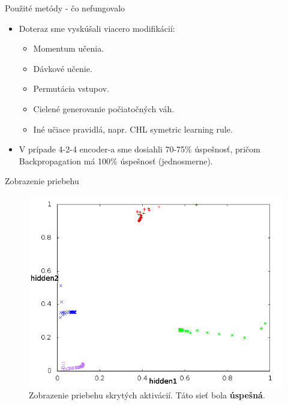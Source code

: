 \documentclass[xcolor=dvipsnames]{beamer}
\begin{document}
\begin{frame}{Použité metódy - čo nefungovalo}
  \begin{itemize}
    \item Doteraz sme vyskúšali viacero modifikácií: 
    \begin{itemize} 
      \item Momentum učenia.
      \item Dávkové učenie. 
      \item Permutácia vstupov. 
      \item Cielené generovanie počiatočných váh. 
      \item Iné učiace pravidlá, napr. CHL symetric learning rule.
    \end{itemize} 
    \item V prípade 4-2-4 encoder-a sme dosiahli 70-75\% úspešnosť, pričom Backpropagation má 100\% úspešnosť (jednosmerne). 
  \end{itemize} 
\end{frame} 

\begin{frame}{Zobrazenie priebehu}
  \begin{figure}[h!]  
    \centering
    \includegraphics[scale=0.4]{img/nice.png}
    \caption{{\tiny Zobrazenie priebehu skrytých aktivácií. Táto sieť bola {\bf úspešná}.}} 
  \end{figure} 
\end{frame} 
\end{document}
